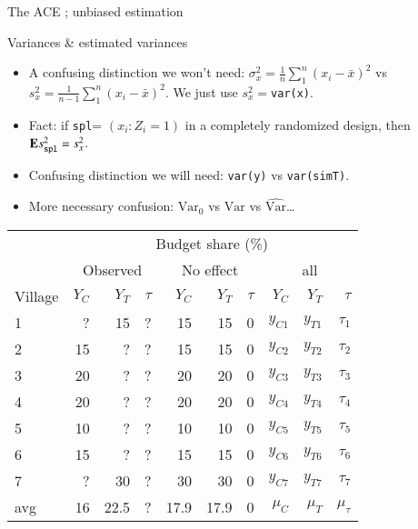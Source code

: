 \begin{frame}{The ACE ; unbiased estimation}
  
\end{frame}

\begin{frame}{Variances \& estimated variances  }

  \begin{itemize}
 \item A confusing distinction we won't need: $\sigma_{x}^{2} = \frac{1}{n} \sum_{1}^{n} (x_{i} - \bar
   x)^{2}$ vs  $s_{x}^{2} = \frac{1}{n-1} \sum_{1}^{n} (x_{i} - \bar
   x)^{2}$.  We just use $s_{x}^{2} =$\texttt{var(x)}.
 \item Fact: if \texttt{spl}= $(x_{i}: Z_{i}=1) $ in a completely
   randomized design, then $\mathbf{E} s_{\mathtt{spl}}^{2} = s_{x}^{2} $. 
  \item Confusing distinction we will need: \texttt{var(y)} vs \texttt{var(simT)}.
  \item More necessary confusion: $\mathrm{Var}_{0}$ vs $\mathrm{Var}$ vs $\widehat{\mathrm{Var}} $\ldots
  \end{itemize}

  \begin{center}
    {\small
\begin{tabular}{l|rrr|rrr|rrr} \hline
& \multicolumn{9}{c}{Budget share (\%)} \\
& \multicolumn{3}{c}{Observed} & \multicolumn{3}{c}{No effect} &\multicolumn{3}{c}{all}\\
Village &$Y_{C}$& $Y_{T}$& $\tau$  &$Y_{C}$& $Y_{T}$& $\tau$  &$Y_{C}$& $Y_{T}$& $\tau$ \\ \hline
1    &  ? & 15 & ?  & 15 & 15  & 0 & $y_{C1}$ & $y_{T1}$  & $\tau_{1}$ \\
2    & 15 & ? &   ?  & 15 & 15 & 0 & $y_{C2}$ & $y_{T2}$ & $\tau_{2}$ \\ 
3    & 20 & ? &   ?  & 20 & 20 & 0 & $y_{C3}$ & $y_{T3}$ & $\tau_{3}$ \\
4    & 20 & ? &   ?  & 20 & 20 & 0 & $y_{C4}$ & $y_{T4}$ & $\tau_{4}$ \\
5    & 10 & ? &   ?  & 10 & 10 & 0 & $y_{C5}$ & $y_{T5}$ & $\tau_{5}$ \\
6    & 15 & ? &   ?  & 15 & 15 & 0 & $y_{C6}$ & $y_{T6}$ & $\tau_{6}$ \\
7    & ?   &30&?  & 30 & 30   & 0 & $y_{C7}$ &$y_{T7}$ & $\tau_{7}$ \\ \hline
avg & 16 & 22.5 & ? & 17.9 & 17.9 & 0 & $\mu_{C} $ & $\mu_{T}$ & $\mu_{\tau}$\\ \hline
\end{tabular}
}
  \end{center}
\end{frame}


